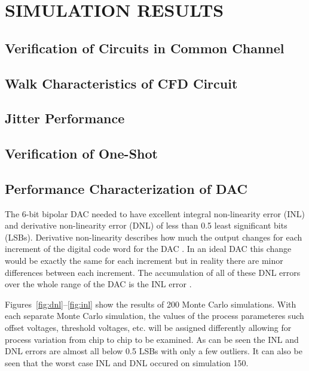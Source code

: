 \documentclass[12pt,oneside,final]{siuethesis}
\theoremstyle{definition}
\begin{document}
\chapter{SIMULATION RESULTS}

\section{Verification of Circuits in Common Channel}

\section{Walk Characteristics of CFD Circuit}

\section{Jitter Performance}

\section{Verification of One-Shot}

\section{Performance Characterization of DAC}
\par The 6-bit bipolar DAC needed to have excellent integral non-linearity error (INL) and derivative non-linearity error (DNL) of less than 0.5 least significant bits (LSBs). Derivative non-linearity describes how much the output changes for each increment of the digital code word for the DAC \cite{ALLEN}. In an ideal DAC this change would be exactly the same for each increment but in reality there are minor differences between each increment. The accumulation of all of these DNL errors over the whole range of the DAC is the INL error \cite{ALLEN}. 

\par Figures~\ref{fig:dnl}--\ref{fig:inl} show the results of 200 Monte Carlo simulations. With each separate Monte Carlo simulation, the values of the process parameteres such offset voltages, threshold voltages, etc. will be assigned differently allowing for process variation from chip to chip to be examined. As can be seen the INL and DNL errors are almost all below 0.5 LSBs with only a few outliers. It can also be seen that the worst case INL and DNL occured on simulation 150.
\end{document}
